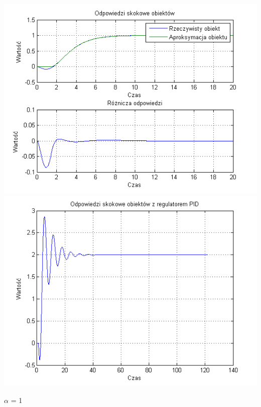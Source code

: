 \documentclass[10pt,a4paper]{article}
\begin{document}
\begin{center}
\includegraphics[scale=1]{images/dwa/skrypt_241.png}\\
\includegraphics[scale=1]{images/dwa/skrypt_242.png}\\
\end{center}
\newpage
$\alpha$ = 1
\end{document}
